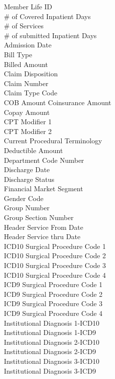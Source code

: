 \documentclass[twoside,11pt]{article}
\begin{document}
{\begin{multicols}{2}
Member Life ID \\
\# of Covered Inpatient Days \\
\# of Services \\
\# of submitted Inpatient Days \\
Admission Date \\
Bill Type \\
Billed Amount \\
Claim Disposition \\
Claim Number \\
Claim Type Code \\
COB Amount
Coinsurance Amount \\
Copay Amount \\
CPT Modifier 1 \\
CPT Modifier 2 \\
Current Procedural Terminology \\
Deductible Amount \\
Department Code Number \\
Discharge Date \\
Discharge Status \\
Financial Market Segment \\
Gender Code \\
Group Number \\
Group Section Number \\
Header Service From Date \\
Header Service thru Date \\
ICD10 Surgical Procedure Code 1 \\
ICD10 Surgical Procedure Code 2 \\
ICD10 Surgical Procedure Code 3 \\
ICD10 Surgical Procedure Code 4 \\
ICD9 Surgical Procedure Code 1 \\
ICD9 Surgical Procedure Code 2 \\
ICD9 Surgical Procedure Code 3 \\
ICD9 Surgical Procedure Code 4 \\
Institutional Diagnosis 1-ICD10 \\
Institutional Diagnosis 1-ICD9 \\
Institutional Diagnosis 2-ICD10 \\
Institutional Diagnosis 2-ICD9 \\
Institutional Diagnosis 3-ICD10 \\
Institutional Diagnosis 3-ICD9 \\

\end{multicols}}
\end{document}
